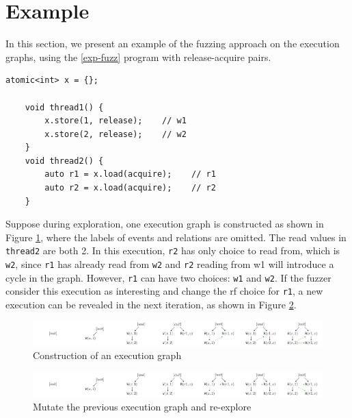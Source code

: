 \section{Example}

In this section, we present an example of the fuzzing approach on the execution graphs, using the \ref{exp-fuzz} program with release-acquire pairs. 

\begin{lstlisting}[caption={Fuzzing example}, label={exp-fuzz}]
    atomic<int> x = {};
    
    void thread1() {
        x.store(1, release);    // w1
        x.store(2, release);    // w2
    }
    void thread2() {
        auto r1 = x.load(acquire);    // r1
        auto r2 = x.load(acquire);    // r2
    }
    \end{lstlisting}



Suppose during exploration, one execution graph is constructed as shown in Figure \ref{example_construct}, where the labels of events and relations are omitted. The read values in \texttt{thread2} are both 2. In this execution, \texttt{r2} has only choice to read from, which is \texttt{w2}, since \texttt{r1} has already read from \texttt{w2} and \texttt{r2} reading from w1 will introduce a cycle in the graph. However, \texttt{r1} can have two choices: \texttt{w1} and \texttt{w2}. If the fuzzer consider this execution as interesting and change the rf choice for \texttt{r1}, a new execution can be revealed in the next iteration, as shown in Figure \ref{example_mutate}. 

\begin{figure}[htbp] 
    \centering
    \includegraphics[scale=0.52]{figure/exec-graph/example_construct.pdf} 
    \caption{Construction of an execution graph} 
    \label{example_construct} 
\end{figure}

\begin{figure}[htbp] 
    \centering
    \includegraphics[scale=0.52]{figure/exec-graph//example_mutate.pdf} 
    \caption{Mutate the previous execution graph and re-explore} 
    \label{example_mutate} 
\end{figure}

